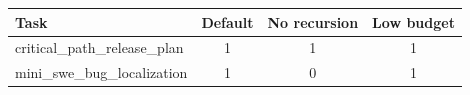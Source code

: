 \begin{tabular}{lccc}
\toprule
Task & Default & No recursion & Low budget \\
\midrule
critical\_path\_release\_plan & 1 & 1 & 1 \\
mini\_swe\_bug\_localization & 1 & 0 & 1 \\
\bottomrule
\end{tabular}
